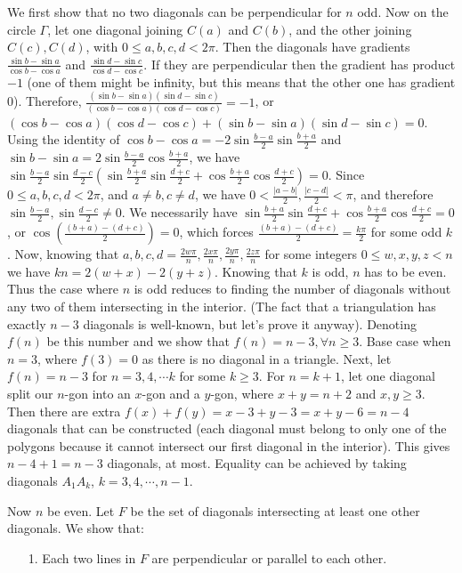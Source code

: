 \documentclass[11pt,a4paper]{article}
\begin{document}
\begin{itemize}
We first show that no two diagonals can be perpendicular for $n$ odd. 
Now on the circle $\Gamma$, let one diagonal joining $C(a)$ and $C(b)$, and the other joining $C(c), C(d)$, 
with $0\le a, b, c, d<2\pi$. 
Then the diagonals have gradients $\frac{\sin b-\sin a}{\cos b-\cos a}$ 
and $\frac{\sin d-\sin c}{\cos d-\cos c}$. 
If they are perpendicular then the gradient has product $-1$ (one of them might be infinity, but this means that the other one has gradient 0). 
Therefore, 
$\frac{(\sin b-\sin a)(\sin d-\sin c)}{(\cos b-\cos a)(\cos d-\cos c)}=-1$, or $(\cos b-\cos a)(\cos d-\cos c)+(\sin b-\sin a)(\sin d-\sin c)=0$. 
Using the identity of $\cos b-\cos a=-2\sin\frac{b-a}{2}\sin\frac{b+a}{2}$ and 
$\sin b-\sin a=2\sin\frac{b-a}{2}\cos\frac{b+a}{2}$, we have 
$\sin\frac{b-a}{2}\sin\frac{d-c}{2}(\sin\frac{b+a}{2}\sin\frac{d+c}{2}+\cos\frac{b+a}{2}\cos\frac{d+c}{2})=0$. 
Since $0\le a,b,c,d<2\pi$, and $a\neq b, c\neq d$, 
we have $0< \frac{|a-b|}2, \frac{|c-d|}2 < \pi$, and therefore 
$\sin\frac{b-a}{2}, \sin\frac{d-c}{2}\neq 0$. 
We necessarily have 
$\sin\frac{b+a}{2}\sin\frac{d+c}{2}+\cos\frac{b+a}{2}\cos\frac{d+c}{2}=0$, or 
$\cos (\frac{(b+a)-(d+c)}2)=0$, which forces 
$\frac{(b+a)-(d+c)}2=\frac{k\pi}2$ for some odd $k$. 
Now, knowing that $a, b, c, d=\frac{2w\pi}{n}, \frac{2x\pi}{n}, \frac{2y\pi}{n}, \frac{2z\pi}{n}$ for some integers $0\le w, x, y, z<n$ we have 
$kn=2(w+x)-2(y+z)$. 
Knowing that $k$ is odd, $n$ has to be even. 
Thus the case where $n$ is odd reduces to finding the number of diagonals without any two of them intersecting in the interior. 
(The fact that a triangulation has exactly $n-3$ diagonals is well-known, but let's prove it anyway). 
Denoting $f(n)$ be this number and we show that $f(n)=n-3, \forall n\ge 3$. 
Base case when $n=3$, where $f(3)=0$ as there is no diagonal in a triangle. 
Next, let $f(n)=n-3$ for $n=3, 4, \cdots k$ for some $k\ge 3$. 
For $n=k+1$, let one diagonal split our $n$-gon into an $x$-gon and a $y$-gon, where $x+y=n+2$ and $x, y\ge 3$. 
Then there are extra $f(x)+f(y)=x-3+y-3=x+y-6=n-4$ diagonals that can be constructed (each diagonal must belong to only one of the polygons because it cannot intersect our first diagonal in the interior). 
This gives $n-4+1=n-3$ diagonals, at most. 
Equality can be achieved by taking diagonals $A_1A_k$, $k=3, 4, \cdots , n-1$.

Now $n$ be even. Let $F$ be the set of diagonals intersecting at least one other diagonals. We show that: 
\begin{itemize}
\item [1.]
Each two lines in $F$ are perpendicular or parallel to each other. 


\end{itemize}
\end{itemize}
\end{document}
